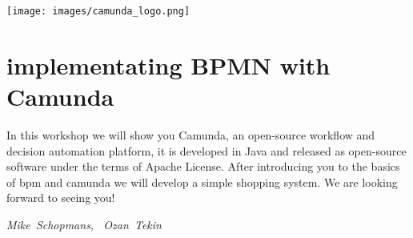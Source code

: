 \hfill\texttt{[image: images/camunda\_logo.png]}
\section*{implementating BPMN with Camunda}

In this workshop we will show you Camunda, 
an open-source workflow and decision automation platform, it is developed in Java and released as open-source software under the terms of Apache License.
After introducing you to the basics of bpm and camunda we will develop a simple shopping system. 
We are looking forward to seeing you! 

\hfill\textit{Mike~Schopmans, ~Ozan~Tekin}
